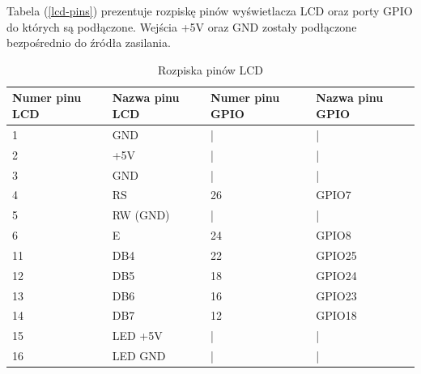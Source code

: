 \documentclass[11pt,a4paper, twoside]{article}
\begin{document}
Tabela (\ref{lcd-pins}) prezentuje rozpiskę pinów wyświetlacza LCD oraz porty GPIO do których są podłączone. Wejścia +5V oraz GND zostały podłączone bezpośrednio do źródła zasilania.
\begin{table}[H]
\begin{center}
\begin{tabular}{ | l | l | l | l | }
\hline
Numer pinu LCD & Nazwa pinu LCD & Numer pinu GPIO & Nazwa pinu GPIO \\ \hline
1 & GND & | &  | \\ \hline
2 & +5V & | &  | \\ \hline
3 & GND & | &  | \\ \hline
4 & RS &  26 & GPIO7 \\ \hline
5 & RW (GND) & | & | \\ \hline 
6 & E & 24 & GPIO8 \\ \hline
11 & DB4 & 22 & GPIO25 \\ \hline
12 & DB5 & 18 & GPIO24 \\ \hline
13 & DB6 & 16 & GPIO23 \\ \hline
14 & DB7 & 12 & GPIO18 \\ \hline
15 & LED +5V & | & | \\ \hline
16 & LED GND & | & | \\ \hline
\end{tabular}
\end{center}
\caption{Rozpiska pinów LCD}
$\label{lcd-pins}$
\end{table}
\end{document}
